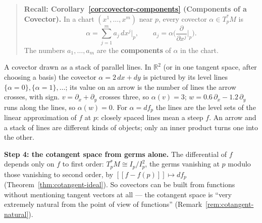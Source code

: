 \documentclass[11pt]{report}
\begin{document}
\begin{quote}
\textbf{Recall: Corollary~\ref{cor:covector-components} (Components of a Covector).} In a chart $(x^1, \ldots, x^m)$ near $p$, every covector $\alpha \in T_p^*M$ is
\[
\alpha = \sum_{j=1}^m a_j\, dx^j\big|_p, \qquad a_j = \alpha\Big(\frac{\partial}{\partial x^j}\Big|_p\Big) .
\]
The numbers $a_1, \ldots, a_m$ are the \textbf{components} of $\alpha$ in the chart.
\end{quote}

\begin{center}
\end{center}

A covector drawn as a stack of parallel lines. In $\mathbb{R}^2$ (or in one tangent space, after choosing a basis) the covector $\alpha = 2\,dx + dy$ is pictured by its level lines $\{\alpha = 0\}, \{\alpha = 1\}, \ldots$; its value on an arrow is the number of lines the arrow crosses, with sign. $v = \partial_x + \partial_y$ crosses three, so $\alpha(v) = 3$; $w = 0.6\,\partial_x - 1.2\,\partial_y$ runs along the lines, so $\alpha(w) = 0$. For $\alpha = df_p$ the lines are the level sets of the linear approximation of $f$ at $p$: closely spaced lines mean a steep $f$. An arrow and a stack of lines are different kinds of objects; only an inner product turns one into the other.

\textbf{Step 4: the cotangent space from germs alone.} The differential of $f$ depends only on $f$ to first order: $T_p^*M \cong I_p/I_p^2$, the germs vanishing at $p$ modulo those vanishing to second order, by $[[f - f(p)]] \mapsto df_p$ (Theorem~\ref{thm:cotangent-ideal}). So covectors can be built from functions without mentioning tangent vectors at all --- the cotangent space is ``very extremely natural from the point of view of functions'' (Remark~\ref{rem:cotangent-natural}).
\end{document}
